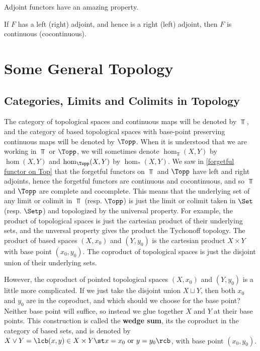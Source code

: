 Adjoint functors have an amazing property.
\begin{thm}
\label{adjoint functor continuity}
If $F$ has a left (right) adjoint, and hence is a right (left) adjoint, then $F$ is continuous (cocontinuous).
\end{thm}






\newpage
\section{Some General Topology}


\subsection{Categories, Limits and Colimits in Topology}

The category of topological spaces and continuous maps will be denoted by $\Top$, and the category of based topological spaces with base-point preserving continuous maps will be denoted by $\Topp$. When it is understood that we are working in $\Top$ or $\Topp$, we will sometimes denote $\hom_{\Top}(X,Y)$ by $\hom(X,Y)$ and $\hom_{\Topp}(X,Y)$ by $\hom_*(X,Y)$. We saw in \cref{forgetful functor on Top} that the forgetful functors on $\Top$ and $\Topp$ have left and right adjoints, hence the forgetful functors are continuous and cocontinuous, and so $\Top $ and $\Topp$ are complete and cocomplete. This means that the underlying set of any limit or colimit in $\Top$ (resp. $\Topp$) is just the limit or colimit taken in $\Set$ (resp. $\Setp$) and topologized by the universal property. For example, the product of topological spaces is just the cartesian product of their underlying sets, and the unversal property gives the product the Tychonoff topology. The product of based spaces $(X,x_0)$ and $(Y,y_0)$ is the cartesian product $X \times Y$ with base point $(x_0,y_0)$. The coproduct of topological spaces is just the disjoint union of their underlying sets. 

However, the coproduct of pointed topological spaces $(X,x_0)$ and $(Y,y_0)$ is a little more complicated. If we just take the disjoint union $X \sqcup Y$, then both $x_0$ and $y_0$ are in the coproduct, and which should we choose for the base point? Neither base point will suffice, so instead we glue together $X$ and $Y$ at their base points. This construction is called the \textbf{wedge sum}, its the coproduct in the category of based sets, and is denoted by $X \vee Y = \lcb (x,y) \in X \times Y \st x=x_0 \text{ or } y=y_0 \rcb$, with base point $(x_0,y_0)$. 

